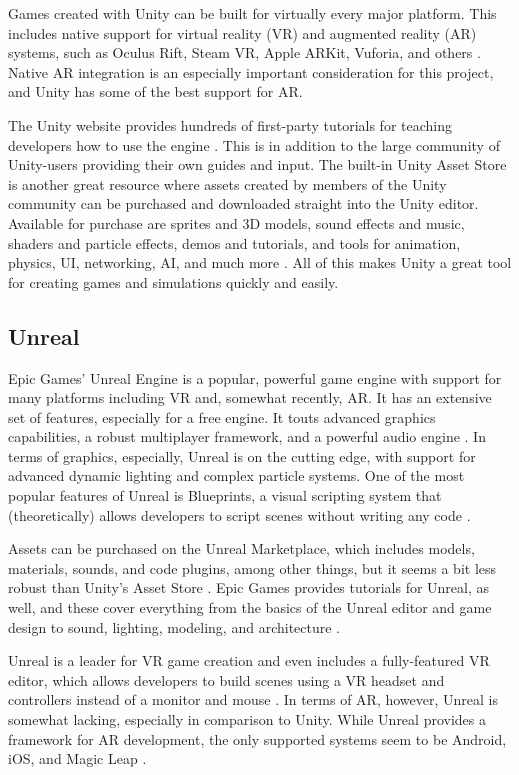 \documentclass[letterpaper, 10pt, onecolumn, draftclsnofoot]{IEEEtran}
\begin{document}
Games created with Unity can be built for virtually every major platform. This includes native support for virtual reality (VR) and augmented reality (AR) systems, such as Oculus Rift, Steam VR, Apple ARKit, Vuforia, and others \cite{unity-multiplatform}. Native AR integration is an especially important consideration for this project, and Unity has some of the best support for AR.

The Unity website provides hundreds of first-party tutorials for teaching developers how to use the engine \cite{unity-tutorials}. This is in addition to the large community of Unity-users providing their own guides and input. The built-in Unity Asset Store is another great resource where assets created by members of the Unity community can be purchased and downloaded straight into the Unity editor. Available for purchase are sprites and 3D models, sound effects and music, shaders and particle effects, demos and tutorials, and tools for animation, physics, UI, networking, AI, and much more \cite{unity-asset-store}. All of this makes Unity a great tool for creating games and simulations quickly and easily.

\subsection{Unreal}
Epic Games' Unreal Engine is a popular, powerful game engine with support for many platforms including VR and, somewhat recently, AR. It has an extensive set of features, especially for a free engine. It touts advanced graphics capabilities, a robust multiplayer framework, and a powerful audio engine \cite{unreal-features}. In terms of graphics, especially, Unreal is on the cutting edge, with support for advanced dynamic lighting and complex particle systems. One of the most popular features of Unreal is Blueprints, a visual scripting system that (theoretically) allows developers to script scenes without writing any code \cite{unreal-blueprints}.

Assets can be purchased on the Unreal Marketplace, which includes models, materials, sounds, and code plugins, among other things, but it seems a bit less robust than Unity's Asset Store \cite{unreal-marketplace}. Epic Games provides tutorials for Unreal, as well, and these cover everything from the basics of the Unreal editor and game design to sound, lighting, modeling, and architecture \cite{unreal-academy}.

Unreal is a leader for VR game creation and even includes a fully-featured VR editor, which allows developers to build scenes using a VR headset and controllers instead of a monitor and mouse \cite{unreal-vr}. In terms of AR, however, Unreal is somewhat lacking, especially in comparison to Unity. While Unreal provides a framework for AR development, the only supported systems seem to be Android, iOS, and Magic Leap \cite{unreal-ar}.
\end{document}
